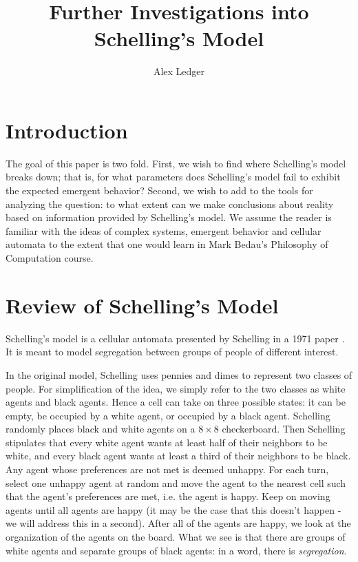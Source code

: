 \documentclass[11pt,twoside]{amsart}
\title{Further Investigations into Schelling's Model}
\author{Alex Ledger}
\date{}
\theoremstyle{theorem}
\theoremstyle{definition}
\theoremstyle{remark}
\begin{document}
\maketitle
\tableofcontents

\newpage

\section{Introduction}
The goal of this paper is two fold. 
First, we wish to find where Schelling's model breaks down; that is, for what parameters does Schelling's model fail to exhibit the expected emergent behavior?
Second, we wish to add to the tools for analyzing the question: to what extent can we make conclusions about reality based on information provided by Schelling's model.
We assume the reader is familiar with the ideas of complex systems, emergent behavior and cellular automata to the extent that one would learn in Mark Bedau's Philosophy of Computation course. 

\section{Review of Schelling's Model}
Schelling's model is a cellular automata presented by Schelling in a 1971 paper \cite{schelling}. 
It is meant to model segregation between groups of people of different interest. 

In the original model, Schelling uses pennies and dimes to represent two classes of people. 
For simplification of the idea, we simply refer to the two classes as white agents and black agents. 
Hence a cell can take on three possible states: it can be empty, be occupied by a white agent, or occupied by a black agent. 
Schelling randomly places black and white agents on a $8 \times 8$ checkerboard. 
Then Schelling stipulates that every white agent wants at least half of their neighbors to be white, and every black agent wants at least a third of their neighbors to be black.
Any agent whose preferences are not met is deemed unhappy. 
For each turn, select one unhappy agent at random and move the agent to the nearest cell such that the agent's preferences are met, i.e. the agent is happy.
Keep on moving agents until all agents are happy (it may be the case that this doesn't happen - we will address this in a second). 
After all of the agents are happy, we look at the organization of the agents on the board. 
What we see is that there are groups of white agents and separate groups of black agents: in a word, there is \emph{segregation}.
\end{document}
